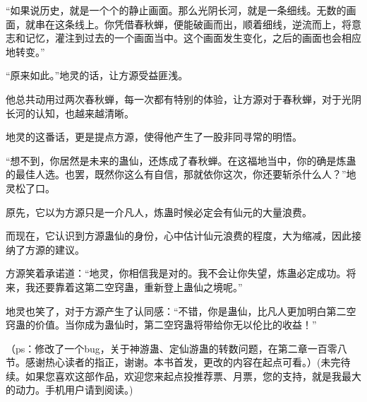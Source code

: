 \begin{this_body}
“如果说历史，就是一个个的静止画面。那么光阴长河，就是一条细线。无数的画面，就串在这条线上。你凭借春秋蝉，便能破画而出，顺着细线，逆流而上，将意志和记忆，灌注到过去的一个画面当中。这个画面发生变化，之后的画面也会相应地转变。”

“原来如此。”地灵的话，让方源受益匪浅。

他总共动用过两次春秋蝉，每一次都有特别的体验，让方源对于春秋蝉，对于光阴长河的认知，也越来越清晰。

地灵的这番话，更是提点方源，使得他产生了一股非同寻常的明悟。

“想不到，你居然是未来的蛊仙，还炼成了春秋蝉。在这福地当中，你的确是炼蛊的最佳人选。也罢，既然你这么有自信，那就依你这次，你还要斩杀什么人？”地灵松了口。

原先，它以为方源只是一介凡人，炼蛊时候必定会有仙元的大量浪费。

而现在，它认识到方源蛊仙的身份，心中估计仙元浪费的程度，大为缩减，因此接纳了方源的建议。

方源笑着承诺道：“地灵，你相信我是对的。我不会让你失望，炼蛊必定成功。将来，我还要靠着这第二空窍蛊，重新登上蛊仙之境呢。”

地灵也笑了，对于方源产生了认同感：“不错，你是蛊仙，比凡人更加明白第二空窍蛊的价值。当你成为蛊仙时，第二空窍蛊将带给你无以伦比的收益！”

（ps：修改了一个bug，关于神游蛊、定仙游蛊的转数问题，在第二章一百零八节。感谢热心读者的指正，谢谢。本书首发，更改的内容在起点可看。）(未完待续。如果您喜欢这部作品，欢迎您来起点投推荐票、月票，您的支持，就是我最大的动力。手机用户请到阅读。)

\end{this_body}

